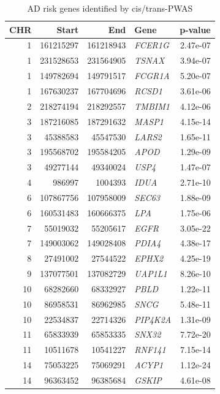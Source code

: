 \begin{longtable}{rrrlr}
\caption{AD risk genes identified by cis/trans-PWAS} \\ 
  \toprule
CHR & Start & End & Gene & p-value \\ 
  \midrule
  1 & 161215297 & 161218943 & \textit{FCER1G} & 2.47e-07 \\ 
    1 & 231528653 & 231564905 & \textit{TSNAX} & 3.94e-07 \\ 
    1 & 149782694 & 149791517 & \textit{FCGR1A} & 5.20e-07 \\ 
    1 & 167630237 & 167704696 & \textit{RCSD1} & 3.61e-06 \\ 
    2 & 218274194 & 218292557 & \textit{TMBIM1} & 4.12e-06 \\ 
    3 & 187216085 & 187291632 & \textit{MASP1} & 4.15e-14 \\ 
    3 & 45388583 & 45547530 & \textit{LARS2} & 1.65e-11 \\ 
    3 & 195568702 & 195584205 & \textit{APOD} & 1.29e-09 \\ 
    3 & 49277144 & 49340024 & \textit{USP4} & 1.47e-07 \\ 
    4 & 986997 & 1004393 & \textit{IDUA} & 2.71e-10 \\ 
    6 & 107867756 & 107958009 & \textit{SEC63} & 1.88e-09 \\ 
    6 & 160531483 & 160666375 & \textit{LPA} & 1.75e-06 \\ 
    7 & 55019032 & 55205617 & \textit{EGFR} & 3.05e-22 \\ 
    7 & 149003062 & 149028408 & \textit{PDIA4} & 4.38e-17 \\ 
    8 & 27491002 & 27544522 & \textit{EPHX2} & 4.25e-19 \\ 
    9 & 137077501 & 137082729 & \textit{UAP1L1} & 8.26e-10 \\ 
   10 & 68282660 & 68332927 & \textit{PBLD} & 1.22e-11 \\ 
   10 & 86958531 & 86962985 & \textit{SNCG} & 5.48e-11 \\ 
   10 & 22534837 & 22714326 & \textit{PIP4K2A} & 1.31e-09 \\ 
   11 & 65833939 & 65853335 & \textit{SNX32} & 7.72e-20 \\ 
   11 & 10511678 & 10541227 & \textit{RNF141} & 7.15e-14 \\ 
   14 & 75053225 & 75069291 & \textit{ACYP1} & 1.12e-24 \\ 
   14 & 96363452 & 96385684 & \textit{GSKIP} & 4.61e-08 \\ 

\end{longtable}
